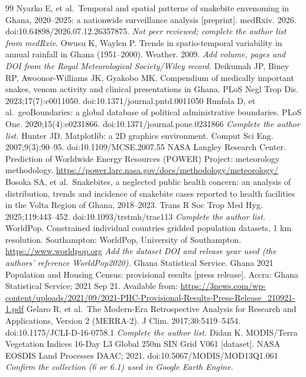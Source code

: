 \documentclass[11pt,a4paper]{article}
\begin{document}
\begin{thebibliography}{99}
 Nyarko E, et al.~Temporal and spatial patterns of snakebite envenoming in Ghana, 2020--2025: a nationwide surveillance analysis {[}preprint{]}. medRxiv. 2026. doi:10.64898/2026.07.12.26357875. \emph{Not peer reviewed; complete the author list from medRxiv.}
 Owusu K, Waylen P. Trends in spatio-temporal variability in annual rainfall in Ghana (1951--2000). Weather. 2009. \emph{Add volume, pages and DOI from the Royal Meteorological Society/Wiley record.}
 Deikumah JP, Biney RP, Awoonor-Williams JK, Gyakobo MK. Compendium of medically important snakes, venom activity and clinical presentations in Ghana. PLoS Negl Trop Dis. 2023;17(7):e0011050. doi:10.1371/journal.pntd.0011050
 Runfola D, et al.~geoBoundaries: a global database of political administrative boundaries. PLoS One. 2020;15(4):e0231866. doi:10.1371/journal.pone.0231866 \emph{Complete the author list.}
 Hunter JD. Matplotlib: a 2D graphics environment. Comput Sci Eng. 2007;9(3):90--95. doi:10.1109/MCSE.2007.55
 NASA Langley Research Center. Prediction of Worldwide Energy Resources (POWER) Project: meteorology methodology. \url{https://power.larc.nasa.gov/docs/methodology/meteorology/}
 Bosoka SA, et al.~Snakebites, a neglected public health concern: an analysis of distribution, trends and incidence of snakebite cases reported to health facilities in the Volta Region of Ghana, 2018--2023. Trans R Soc Trop Med Hyg. 2025;119:443--452. doi:10.1093/trstmh/trae113 \emph{Complete the author list.}
 WorldPop. Constrained individual countries gridded population datasets, 1 km resolution. Southampton: WorldPop, University of Southampton. \url{https://www.worldpop.org} \emph{Add the dataset DOI and release year used (the authors' reference WorldPop2020).}
 Ghana Statistical Service. Ghana 2021 Population and Housing Census: provisional results {[}press release{]}. Accra: Ghana Statistical Service; 2021 Sep 21. Available from: \url{https://3news.com/wp-content/uploads/2021/09/2021-PHC-Provisional-Results-Press-Release_210921-1.pdf}
 Gelaro R, et al.~The Modern-Era Retrospective Analysis for Research and Applications, Version 2 (MERRA-2). J Clim. 2017;30:5419--5454. doi:10.1175/JCLI-D-16-0758.1 \emph{Complete the author list.}
 Didan K. MODIS/Terra Vegetation Indices 16-Day L3 Global 250m SIN Grid V061 {[}dataset{]}. NASA EOSDIS Land Processes DAAC; 2021. doi:10.5067/MODIS/MOD13Q1.061 \emph{Confirm the collection (6 or 6.1) used in Google Earth Engine.}

\end{thebibliography}
\end{document}
